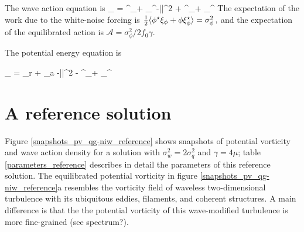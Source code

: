 \documentclass[12pt]{article}
\newcommand{\D}{\mathcal{D}}
\newcommand{\phis}{\phi^\star}
\renewcommand{\P}{\mathcal{P}}
\newcommand{\A}{  \mathcal{A}}
\begin{document}
The wave action equation is
\beq
{} _{ \A} = \la \phis \xi_\phi +
\phi \xi_\phis \ra -\gamma \la |\phi|^2 \ra +  \la \phis\D_\phi + \phi\D_\phis \ra\per
\label{A}
\eeq
The expectation of the work due to the white-noise forcing is $ \tfrac{1}{2}\la \phis \xi_\phi+\phi \xi_\phis \ra = \sigma_\phi^2\com$
and the expectation of the equilibrated action is $\A = \sigma_\phi^2/2f_0\gamma$.

The potential energy equation  is

\beq
{} _{ \P} = \Gamma_r + \Gamma_a
 -\gamma \la |\nabla\phi|^2 \ra -  \la \lap\phis\D_\phi + \lap\phi\D_\phis \ra\per
\label{P}
\eeq

\section{A reference solution}
Figure \ref{snapshots_pv_qg-niw_reference} shows snapshots of potential vorticity and wave
action density for a solution with $\sigma_w^2 = 2\sigma_q^2$ and $\gamma = 4\mu$; table
\ref{parameters_reference} describes in detail the parameters of
this reference solution. The equilibrated potential vorticity in figure
\ref{snapshots_pv_qg-niw_reference}a  resembles the vorticity field
of waveless two-dimensional turbulence with its ubiquitous eddies, filaments,
and coherent structures. A main difference is that the the potential vorticity
of this wave-modified turbulence is more fine-grained (see spectrum?).
\end{document}
